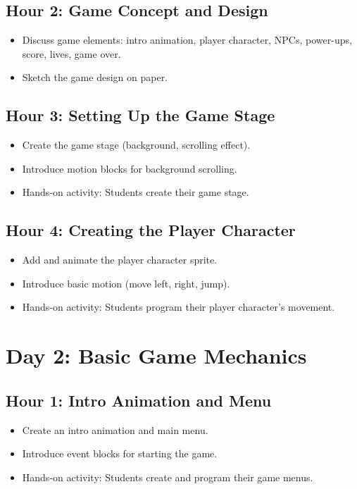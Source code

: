 \documentclass[main.tex]{subfiles}
\begin{document}
\subsection*{Hour 2: Game Concept and Design}
\begin{itemize}
    \item Discuss game elements: intro animation, player character, NPCs, power-ups, score, lives, game over.
    \item Sketch the game design on paper.
\end{itemize}

\subsection*{Hour 3: Setting Up the Game Stage}
\begin{itemize}
    \item Create the game stage (background, scrolling effect).
    \item Introduce motion blocks for background scrolling.
    \item Hands-on activity: Students create their game stage.
\end{itemize}

\subsection*{Hour 4: Creating the Player Character}
\begin{itemize}
    \item Add and animate the player character sprite.
    \item Introduce basic motion (move left, right, jump).
    \item Hands-on activity: Students program their player character's movement.
\end{itemize}

\section*{Day 2: Basic Game Mechanics}
\subsection*{Hour 1: Intro Animation and Menu}
\begin{itemize}
    \item Create an intro animation and main menu.
    \item Introduce event blocks for starting the game.
    \item Hands-on activity: Students create and program their game menus.
\end{itemize}
\end{document}

